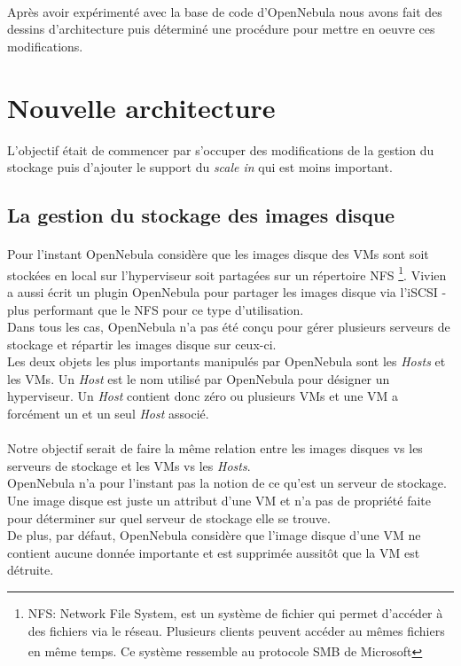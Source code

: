 \paragraph*{}
Après avoir expérimenté avec la base de code d'OpenNebula nous avons fait des dessins d'architecture puis déterminé une procédure pour mettre en oeuvre ces
modifications.


\section{Nouvelle architecture}

L'objectif était de commencer par s'occuper des modifications de la gestion du stockage puis d'ajouter le support du \emph{scale in} qui est moins important.

\subsection{La gestion du stockage des images disque}
\paragraph*{}
Pour l'instant OpenNebula considère que les images disque des VMs sont soit stockées en local sur l'hyperviseur soit partagées sur un répertoire NFS
	\footnote{NFS: Network File System, est un système de fichier qui permet d'accéder à des fichiers via le réseau. Plusieurs clients peuvent accéder
	au mêmes fichiers en même temps. Ce système ressemble au protocole SMB de Microsoft\textsuperscript{\textregistered}}.
Vivien a aussi écrit un plugin OpenNebula pour partager les images disque via l'iSCSI - plus performant que le NFS pour ce type d'utilisation.
\\
Dans tous les cas, OpenNebula n'a pas été conçu pour gérer plusieurs serveurs de stockage et répartir les images disque sur ceux-ci.
\\
Les deux objets les plus importants manipulés par OpenNebula sont les \emph{Hosts} et les VMs. Un \emph{Host} est le nom utilisé par OpenNebula pour
désigner un hyperviseur.
Un \emph{Host} contient donc zéro ou plusieurs VMs et une VM a forcément un et un seul \emph{Host} associé.


\paragraph*{}
Notre objectif serait de faire la même relation entre les images disques vs les serveurs de stockage et les VMs vs les \emph{Hosts}.
\\
OpenNebula n'a pour l'instant pas la notion de ce qu'est un serveur de stockage. Une image disque est juste un attribut d'une VM et n'a
pas de propriété faite pour déterminer sur quel serveur de stockage elle se trouve.\\
De plus, par défaut, OpenNebula considère que l'image disque d'une VM ne contient aucune donnée importante et est supprimée aussitôt
que la VM est détruite.

